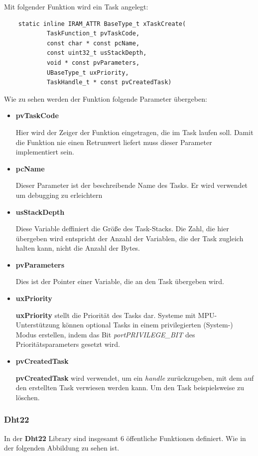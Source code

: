 Mit folgender Funktion wird ein Task angelegt:
\begin{verbatim}
    static inline IRAM_ATTR BaseType_t xTaskCreate(
            TaskFunction_t pvTaskCode,
            const char * const pcName,
            const uint32_t usStackDepth,
            void * const pvParameters,
            UBaseType_t uxPriority,
            TaskHandle_t * const pvCreatedTask)
\end{verbatim}

Wie zu sehen werden der Funktion folgende Parameter übergeben:
\begin{itemize}
    \item \textbf{pvTaskCode}

    Hier wird der Zeiger der Funktion eingetragen, die im Task laufen soll. Damit die Funktion nie einen Retrunwert liefert muss dieser Parameter implementiert sein.
    \item \textbf{pcName}
    
    Dieser Parameter ist der beschreibende Name des Tasks. Er wird verwendet um debugging zu erleichtern

    \item \textbf{usStackDepth}
    
    Diese Variable deffiniert die Größe des Task-Stacks. Die Zahl, die hier übergeben wird entspricht der Anzahl der Variablen, die der Task zugleich halten kann, nicht die Anzahl der Bytes.
    \item \textbf{pvParameters}
    
    Dies ist der Pointer einer Variable, die an den Task übergeben wird.
    \item  \textbf{uxPriority}
    
    \textbf{uxPriority} stellt die Priorität des Tasks dar. Systeme mit MPU-Unterstützung können optional Tasks in einem privilegierten (System-) Modus erstellen, indem das Bit \textit{portPRIVILEGE\_BIT} des Prioritätsparameters gesetzt wird.
    \item \textbf{pvCreatedTask}
    
    \textbf{pvCreatedTask} wird verwendet, um ein \textit{handle} zurückzugeben, mit dem auf den erstellten Task verwiesen werden kann. Um den Task beispielsweise zu löschen.
\end{itemize}
\cite{xTaskCreate_definition}

\subsubsection{Dht22}\label{sec:esp-idf-libraries-dht22}
In der \textbf{Dht22} Library sind insgesamt 6 öffentliche Funktionen definiert. Wie in der folgenden Abbildung zu sehen ist.

